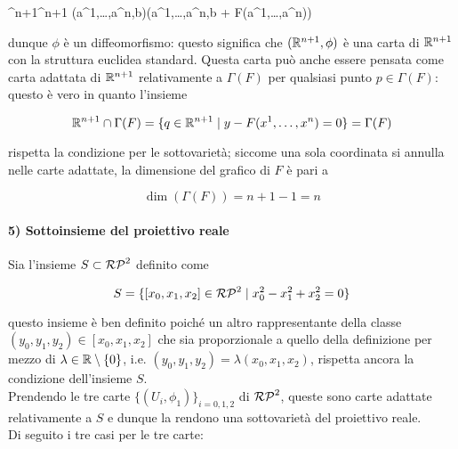 	{\R^{n+1}}{\R^{n+1}}
	{(a^{1},\dots,a^{n},b)}{(a^{1},\dots,a^{n},b + F(a^{1},\dots,a^{n}))}

dunque $ \phi $ è un diffeomorfismo: questo significa che $ (\mathbb{R}^{n+1},\phi) $ è una carta di $ \mathbb{R}^{n+1} $ con la struttura euclidea standard. Questa carta può anche essere pensata come carta adattata di $ \mathbb{R}^{n+1} $ relativamente a $ \Gamma(F) $ per qualsiasi punto $ p \in \Gamma(F) $: questo è vero in quanto l'insieme

\begin{equation}
	\mathbb{R}^{n+1} \cap \Gamma(F) = \{ q \in \mathbb{R}^{n+1} \mid y - F(x^{1},\dots,x^{n}) = 0 \} = \Gamma(F)
\end{equation}

rispetta la condizione per le sottovarietà; siccome una sola coordinata si annulla nelle carte adattate, la dimensione del grafico di $ F $ è pari a

\begin{equation}
	\dim(\Gamma(F)) = n+1-1 = n
\end{equation}

\paragraph{5) Sottoinsieme del proiettivo reale}

Sia l'insieme $ S \subset \mathcal{RP}^{2} $ definito come

\begin{equation}
	S = \{ [x_{0},x_{1},x_{2}] \in \mathcal{RP}^{2} \mid x_{0}^{2} - x_{1}^{2} + x_{2}^{2} = 0 \}
\end{equation}

questo insieme è ben definito poiché un altro rappresentante della classe $ (y_{0},y_{1},y_{2}) \in [x_{0},x_{1},x_{2}] $ che sia proporzionale a quello della definizione per mezzo di $ \lambda \in \mathbb{R} \setminus \{0\} $, i.e. $ (y_{0},y_{1},y_{2}) = \lambda (x_{0},x_{1},x_{2}) $, rispetta ancora la condizione dell'insieme $ S $.\\
Prendendo le tre carte $ \{(U_{i},\phi_{1})\}_{i=0,1,2} $ di $ \mathcal{RP}^{2} $, queste sono carte adattate relativamente a $ S $ e dunque la rendono una sottovarietà del proiettivo reale.\\
Di seguito i tre casi per le tre carte:

